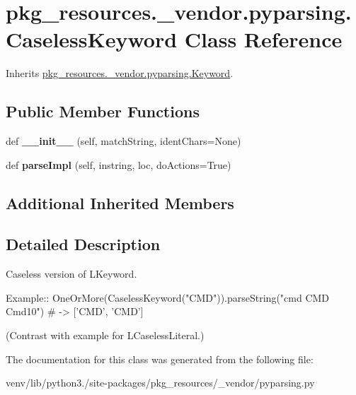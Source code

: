 \hypertarget{classpkg__resources_1_1__vendor_1_1pyparsing_1_1_caseless_keyword}{}\section{pkg\+\_\+resources.\+\_\+vendor.\+pyparsing.\+Caseless\+Keyword Class Reference}
\label{classpkg__resources_1_1__vendor_1_1pyparsing_1_1_caseless_keyword}


Inherits \hyperlink{classpkg__resources_1_1__vendor_1_1pyparsing_1_1_keyword}{pkg\+\_\+resources.\+\_\+vendor.\+pyparsing.\+Keyword}.

\subsection*{Public Member Functions}
\begin{DoxyCompactItemize}
\item 
\mbox{\label{classpkg__resources_1_1__vendor_1_1pyparsing_1_1_caseless_keyword_a76b2716edd2626af7bad541555b41152}} 
def {\bfseries \+\_\+\+\_\+init\+\_\+\+\_\+} (self, match\+String, ident\+Chars=None)
\item 
\mbox{\label{classpkg__resources_1_1__vendor_1_1pyparsing_1_1_caseless_keyword_a2d91f035d202ecdbbb70996640906bda}} 
def {\bfseries parse\+Impl} (self, instring, loc, do\+Actions=True)
\end{DoxyCompactItemize}
\subsection*{Additional Inherited Members}


\subsection{Detailed Description}
\begin{DoxyVerb}Caseless version of L{Keyword}.

Example::
    OneOrMore(CaselessKeyword("CMD")).parseString("cmd CMD Cmd10") # -> ['CMD', 'CMD']
    
(Contrast with example for L{CaselessLiteral}.)
\end{DoxyVerb}
 

The documentation for this class was generated from the following file\+:\begin{DoxyCompactItemize}
\item 
venv/lib/python3./site-\/packages/pkg\+\_\+resources/\+\_\+vendor/pyparsing.\+py\end{DoxyCompactItemize}
